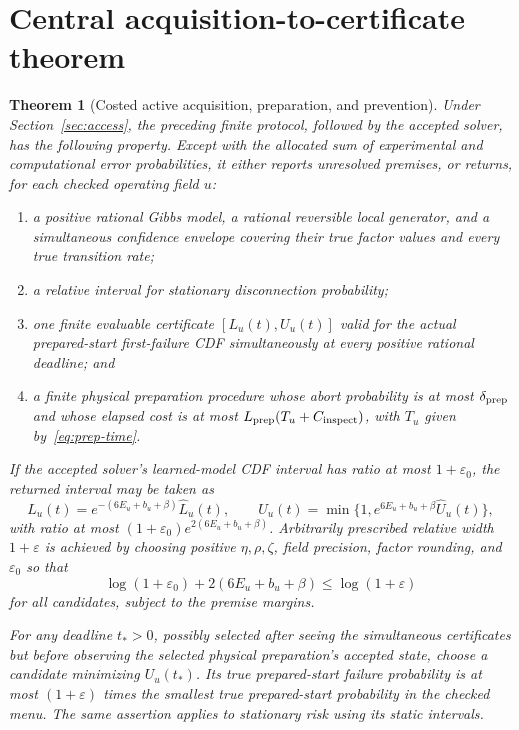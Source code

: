 \documentclass[11pt]{article}
\newtheorem{theorem}{Theorem}
\newcommand{\eps}{\varepsilon}
\begin{document}
\section{Central acquisition-to-certificate theorem}
\begin{theorem}[Costed active acquisition, preparation, and prevention]
\label{thm:central}
Under Section~\ref{sec:access}, the preceding finite protocol, followed by the accepted solver, has the following property. Except with the allocated sum of experimental and computational error probabilities, it either reports unresolved premises, or returns, for each checked operating field $u$:
\begin{enumerate}
\item a positive rational Gibbs model, a rational reversible local generator, and a simultaneous confidence envelope covering their true factor values and every true transition rate;
\item a relative interval for stationary disconnection probability;
\item one finite evaluable certificate $[L_u(t),U_u(t)]$ valid for the actual prepared-start first-failure CDF simultaneously at every positive rational deadline; and
\item a finite physical preparation procedure whose abort probability is at most $\delta_{\rm prep}$ and whose elapsed cost is at most $L_{\rm prep}(T_u+C_{\rm inspect})$, with $T_u$ given by~\eqref{eq:prep-time}.
\end{enumerate}
If the accepted solver's learned-model CDF interval has ratio at most $1+\eps_0$, the returned interval may be taken as
\begin{equation}
 L_u(t)=e^{-(6E_u+b_u+\beta)}\widehat L_u(t),\qquad
 U_u(t)=\min\{1,e^{6E_u+b_u+\beta}\widehat U_u(t)\},
 \label{eq:final-band}
\end{equation}
with ratio at most $(1+\eps_0)e^{2(6E_u+b_u+\beta)}$. Arbitrarily prescribed relative width $1+\eps$ is achieved by choosing positive $\eta,\rho,\zeta$, field precision, factor rounding, and $\eps_0$ so that
\[
 \log(1+\eps_0)+2(6E_u+b_u+\beta)\le\log(1+\eps)
\]
for all candidates, subject to the premise margins.

For any deadline $t_*>0$, possibly selected after seeing the simultaneous certificates but before observing the selected physical preparation's accepted state, choose a candidate minimizing $U_u(t_*)$. Its true prepared-start failure probability is at most $(1+\eps)$ times the smallest true prepared-start probability in the checked menu. The same assertion applies to stationary risk using its static intervals.


\end{theorem}
\end{document}
